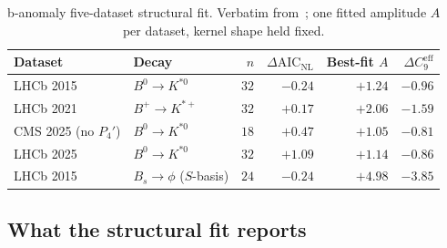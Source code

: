 \begin{table}[ht]
\centering
\small
\caption{b-anomaly five-dataset structural fit. Verbatim
from~\citep{SmartBAnomaly2026}; one fitted amplitude $A$ per
dataset, kernel shape held fixed.}
\label{tab:banomaly}
\begin{tabular}{l l r r r r}
\toprule
Dataset & Decay & $n$ & $\Delta\mathrm{AIC}_{\mathrm{NL}}$ &
   Best-fit $A$ & $\Delta C_{9}^{\mathrm{eff}}$ \\
\midrule
LHCb 2015 & $B^{0}\!\to\!K^{*0}$ & $32$ & $-0.24$ & $+1.24$ & $-0.96$ \\
LHCb 2021 & $B^{+}\!\to\!K^{*+}$ & $32$ & $+0.17$ & $+2.06$ & $-1.59$ \\
CMS 2025 (no $P_{4}'$) & $B^{0}\!\to\!K^{*0}$ & $18$ & $+0.47$ & $+1.05$ & $-0.81$ \\
LHCb 2025 & $B^{0}\!\to\!K^{*0}$ & $32$ & $+1.09$ & $+1.14$ & $-0.86$ \\
LHCb 2015 & $B_{s}\!\to\!\phi$ ($S$-basis) & $24$ & $-0.24$ & $+4.98$ & $-3.85$ \\
\bottomrule
\end{tabular}
\end{table}

\subsection{What the structural fit reports}

